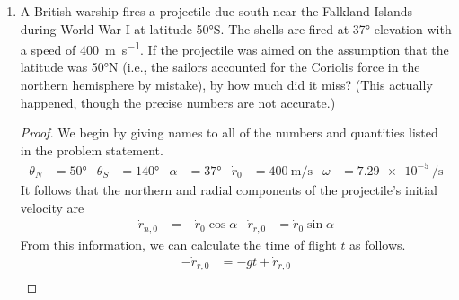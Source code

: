 \documentclass[../psets.tex]{subfiles}
\begin{document}
\begin{enumerate}
\begin{enumerate}
\begin{proof}
            \begin{align*}
                \dv{\vec{a}}{t} &= \vec{v}-\vec{v'}\\
                \Aboxed{\dv{\vec{a}}{t} &= (\SI[per-mode=symbol]{672}{\kilo\meter\per\hour})\jhat}
            \end{align*}
        \end{proof}
        \item If it flies east.
        \begin{proof}
            If $\vec{v}'=(\SI[per-mode=symbol]{1000}{\kilo\meter\per\hour})\jhat$, then the overall velocity is
            \begin{align*}
                \dv{\vec{a}}{t} &= \vec{v}+\vec{v'}\\
                \Aboxed{\dv{\vec{a}}{t} &= (\SI[per-mode=symbol]{2672}{\kilo\meter\per\hour})\jhat}
            \end{align*}
        \end{proof}
    \end{enumerate}
    \item A British warship fires a projectile due south near the Falkland Islands during World War I at latitude \ang{50}S. The shells are fired at \ang{37} elevation with a speed of \SI[per-mode=symbol]{400}{\meter\per\second}. If the projectile was aimed on the assumption that the latitude was \ang{50}N (i.e., the sailors accounted for the Coriolis force in the northern hemisphere by mistake), by how much did it miss? (This actually happened, though the precise numbers are not accurate.)
    \begin{proof}
        We begin by giving names to all of the numbers and quantities listed in the problem statement.
        \begin{align*}
            \theta_N &= \ang{50}&
            \theta_S &= \ang{140}&
            \alpha &= \ang{37}&
            \dot{r}_0 &= \SI[per-mode=symbol]{400}{\meter\per\second}&
            \omega &= \SI{7.29e-5}{\per\second}
        \end{align*}
        It follows that the northern and radial components of the projectile's initial velocity are
        \begin{align*}
            \dot{r}_{n,0} &= -\dot{r}_0\cos\alpha&
            \dot{r}_{r,0} &= \dot{r}_0\sin\alpha
        \end{align*}
        From this information, we can calculate the time of flight $t$ as follows.
        \begin{align*}
            -\dot{r}_{r,0} &= -gt+\dot{r}_{r,0}\\

\end{align*}
\end{proof}
\end{enumerate}
\end{document}

